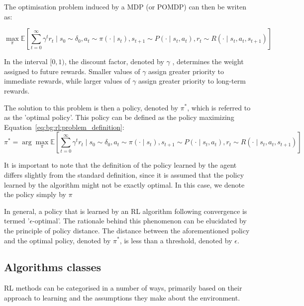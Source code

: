 The optimisation problem induced by a MDP (or POMDP) can then be writen as:

\begin{equation}\label{eq:bg:rl:problem_definition}
    \max_\pi \mathbb{E} \left[ \sum_{t=0}^\infty \gamma^t r_t \mid s_0 \sim \delta_0, a_t \sim \pi(\cdot \mid s_t), s_{t+1} \sim P(\cdot \mid s_t, a_t), r_t \sim R(\cdot \mid s_t, a_t, s_{t+1}) \right]
\end{equation}

In the interval $[0,1)$, the discount factor, denoted by $\gamma$ , determines the weight assigned to future rewards.
Smaller values of $\gamma$ assign greater priority to immediate rewards, while larger values of $\gamma$ assign greater
priority to long-term rewards.

The solution to this problem is then a policy, denoted by $\pi^*$, which is referred to as the 'optimal policy'.
This policy can be defined as the policy maximizing Equation~\ref{eq:bg:rl:problem_definition}:
\begin{equation}\label{eq:bg:rl:optimal_policy}
    \pi^* = \arg\max_\pi \mathbb{E} \left[ \sum_{t=0}^\infty \gamma^t r_t \mid s_0 \sim \delta_0, a_t \sim \pi(\cdot \mid s_t), s_{t+1} \sim P(\cdot \mid s_t, a_t), r_t \sim R(\cdot \mid s_t, a_t, s_{t+1}) \right]
\end{equation}

It is important to note that the definition of the policy learned by the agent differs slightly from the standard
definition, since it is assumed that the policy learned by the algorithm might not be exactly optimal.
In this case, we denote the policy simply by $\pi$

In general, a policy that is learned by an RL algorithm following convergence is termed '$\epsilon$-optimal'.
The rationale behind this phenomenon can be elucidated by the principle of policy distance.
The distance between the aforementioned policy and the optimal policy, denoted by $\pi^*$, is less than a threshold,
denoted by $\epsilon$.

\subsection{Algorithms classes}\label{subsection:bg:rl:algs}

RL methods can be categorised in a number of ways, primarily based on their approach to learning and the assumptions
they make about the environment.

